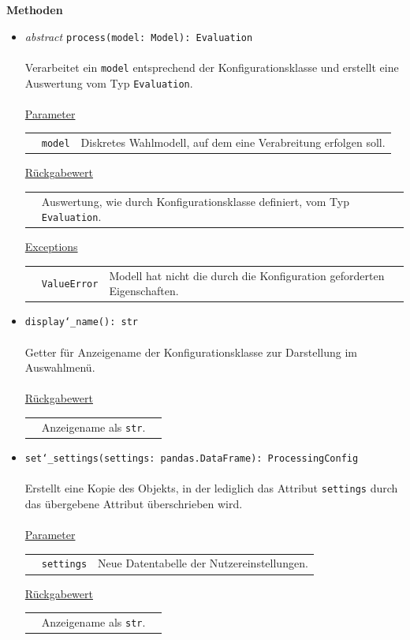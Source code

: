 \documentclass{article}
\begin{document}
\textbf{{Methoden}}
\begin{itemize}\setlength\itemsep{3em}
\item \textit{\flqq{}abstract\frqq} \texttt{process(model: Model): Evaluation}\\\\
Verarbeitet ein \texttt{model} entsprechend der Konfigurationsklasse und erstellt eine Auswertung vom Typ \texttt{Evaluation}.
\\\\
\underline{{Parameter}}\\
\begin{tabular}{lll}
 & \texttt{model} & Diskretes Wahlmodell, auf dem eine Verabreitung erfolgen soll.\\
\end{tabular}

\underline{{Rückgabewert}}\\
\begin{tabular}{lll}
 & Auswertung, wie durch Konfigurationsklasse definiert, vom Typ \texttt{Evaluation}.\\
\end{tabular}

\underline{{Exceptions}}\\
\begin{tabular}{lll}
 & \texttt{ValueError} & Modell hat nicht die durch die Konfiguration geforderten Eigenschaften.\\
\end{tabular}

\item \texttt{display\char`_name(): str}\\\\
Getter für Anzeigename der Konfigurationsklasse zur Darstellung im Auswahlmenü.
\\\\
\underline{{Rückgabewert}}\\
\begin{tabular}{lll}
 & Anzeigename als \texttt{str}.\\
\end{tabular}

\item \texttt{set\char`_settings(settings: pandas.DataFrame): ProcessingConfig}\\\\
Erstellt eine Kopie des Objekts, in der lediglich das Attribut \texttt{settings} durch das übergebene Attribut überschrieben wird.
\\\\
\underline{{Parameter}}\\
\begin{tabular}{lll}
 & \texttt{settings} & Neue Datentabelle der Nutzereinstellungen.\\
\end{tabular}

\underline{{Rückgabewert}}\\
\begin{tabular}{lll}
 & Anzeigename als \texttt{str}.\\
\end{tabular}
\end{itemize}
\end{document}
